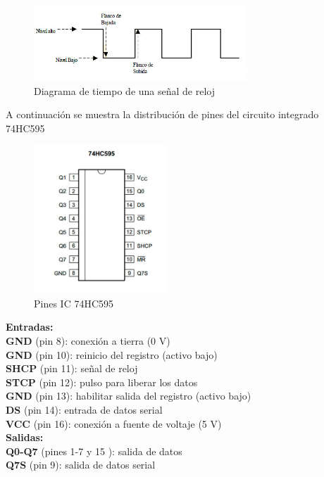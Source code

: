 \documentclass{article}
\begin{document}
\begin{figure}[!ht]
\includegraphics[width=8cm]{flanco1.jpg}
\centering
\caption{Diagrama de tiempo de una señal de reloj}
\end{figure}

A continuación se muestra la distribución de pines del circuito integrado 74HC595\\

\begin{figure}[!ht]
\includegraphics[width=5cm]{74HC595.jpg}
\centering
\caption{Pines IC 74HC595}
\end{figure}

\noindent\textbf{Entradas:}\\
\indent \textbf{GND} (pin 8): conexión a tierra (0 V)\\
\indent \textbf{GND} (pin 10): reinicio del registro (activo bajo)\\
\indent \textbf{SHCP} (pin 11): señal de reloj \\
\indent \textbf{STCP} (pin 12): pulso para liberar los datos \\
\indent \textbf{GND} (pin 13): habilitar salida del registro (activo bajo)\\
\indent \textbf{DS} (pin 14): entrada de datos serial \\
\indent \textbf{VCC} (pin 16): conexión a fuente de voltaje (5 V)\\

\noindent\textbf{Salidas:}\\ 
\indent \textbf{Q0-Q7} (pines 1-7 y 15 ): salida de datos\\
\indent \textbf{Q7S} (pin 9): salida de datos serial\\
\vspace{1cm}
\end{document}
